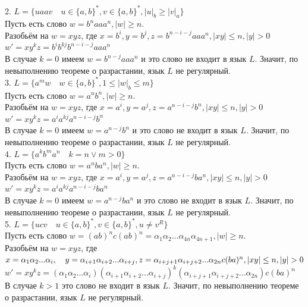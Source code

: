 \documentclass{article}
\begin{document}
    2. $L=\{uaav \quad u \in \{a,b\}^*, v \in \{a,b\}^*, |u|_b \geq |v|_a\}$\\
    Пусть есть слово $w=b^naaa^n, |w|\geq n$.\\
    Разобьём на $w=xyz$, где $x=b^i, y=b^j, z=b^{n-i-j}aaa^n, |xy|\leq n, |y|>0$\\
    $w'=xy^kz = b^ib^{kj}b^{n-i-j}aaa^n$\\
    В случае $k=0$ имеем $w=b^{n-j}aaa^n$ и это слово не входит в язык $L$. Значит, по невыполнению теореме о разрастании, язык $L$ не регулярный.\\
    
    3. $L=\{a^mw \quad w\in \{a,b\}^*,1\leq|w|_b\leq m\}$\\
    Пусть есть слово $w=a^nb^n, |w|\geq n$.\\
    Разобьём на $w=xyz$, где $x=a^i, y=a^j, z=a^{n-i-j}b^n, |xy|\leq n, |y|>0$\\
    $w'=xy^kz = a^ia^{kj}a^{n-i-j}b^n$\\
    В случае $k=0$ имеем $w=a^{n-j}b^n$ и это слово не входит в язык $L$. Значит, по невыполнению теореме о разрастании, язык $L$ не регулярный.\\
    
    4. $L=\{a^kb^ma^n \quad k=n \vee m>0\}$\\
    Пусть есть слово $w=a^nba^n, |w|\geq n$.\\
    Разобьём на $w=xyz$, где $x=a^i, y=a^j, z=a^{n-i-j}ba^n, |xy|\leq n, |y|>0$\\
    $w'=xy^kz = a^ia^{kj}a^{n-i-j}ba^n$\\
    В случае $k=0$ имеем $w=a^{n-j}ba^n$ и это слово не входит в язык $L$. Значит, по невыполнению теореме о разрастании, язык $L$ не регулярный.\\
    
    5. $L=\{ucv \quad u\in\{a,b\}^*, v\in\{a,b\}^*, u \neq v^R\}$\\
    Пусть есть слово $w=(ab)^nc(ab)^n = \alpha_1\alpha_2...\alpha_{4n}\alpha_{4n+1}, |w|\geq n$.\\
    Разобьём на $w=xyz$, где\\ $x=\alpha_1\alpha_2...\alpha_{i}, \quad y=\alpha_{i+1}\alpha_{i+2}...\alpha_{i+j},\\ z=\alpha_{i+j+1}\alpha_{i+j+2}...\alpha_{2n}c(ba)^n, |xy|\leq n, |y|>0$\\
    $w'=xy^kz = (\alpha_1\alpha_2...\alpha_{i}) (\alpha_{i+1}\alpha_{i+2}...\alpha_{i+j})^k (\alpha_{i+j+1}\alpha_{i+j+2}...\alpha_{2n})c(ba)^n$\\
    В случае $k>1$ это слово не входит в язык $L$. Значит, по невыполнению теореме о разрастании, язык $L$ не регулярный.
\end{document}
